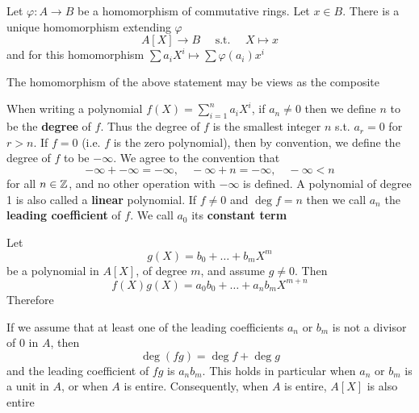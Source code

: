 \documentclass[11pt]{article}
\def \ev {\text{ev}}
\begin{document}
\begin{proposition}[]
Let \(\varphi:A\to B\) be a homomorphism of commutative rings. Let \(x\in B\). There is a unique
homomorphism extending \(\varphi\)
\begin{equation*}
A[X]\to B\quad\text{ s.t. }\quad X\mapsto x
\end{equation*}
and for this homomorphism \(\sum a_iX^i\mapsto\sum\varphi(a_i)x^i\)
\end{proposition}

The homomorphism of the above statement may be views as the composite
\begin{center}\end{center}

When writing a polynomial \(f(X)=\displaystyle\sum_{i=1}^na_iX^i\), if \(a_n\neq 0\) then we define \(n\) to be the
\textbf{degree} of \(f\). Thus the degree of \(f\) is the smallest integer \(n\) s.t. \(a_r=0\)
for \(r>n\). If \(f=0\) (i.e. \(f\) is the zero polynomial), then by convention, we define the
degree of \(f\) to be \(-\infty\). We agree to the convention that
\begin{equation*}
-\infty+-\infty=-\infty,\quad-\infty+n=-\infty,\quad-\infty<n
\end{equation*}
for all \(n\in\mathbb{Z}\), and no other operation with \(-\infty\) is defined. A polynomial of degree 1 is also
called a \textbf{linear} polynomial. If \(f\neq 0\) and \(\deg f=n\) then we call \(a_n\) the \textbf{leading
coefficient} of \(f\). We call \(a_0\) its \textbf{constant term}

Let
\begin{equation*}
g(X)=b_0+\dots+b_mX^m
\end{equation*}
be a polynomial in \(A[X]\), of degree \(m\), and assume \(g\neq 0\). Then
\begin{equation*}
f(X)g(X)=a_0b_0+\dots+a_nb_mX^{m+n}
\end{equation*}
Therefore
\begin{proposition}[]
If we assume that at least one of the leading coefficients \(a_n\) or \(b_m\) is not a divisor of
0 in \(A\), then
\begin{equation*}
\deg(fg)=\deg f+\deg g
\end{equation*}
and the leading coefficient of \(fg\) is \(a_nb_m\). This holds in particular when \(a_n\)
or \(b_m\) is a unit in \(A\), or when \(A\) is entire. Consequently, when \(A\) is
entire, \(A[X]\) is also entire
\end{proposition}
\end{document}
